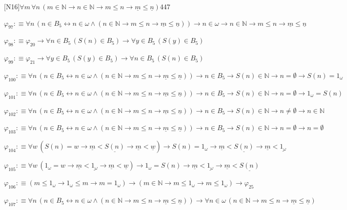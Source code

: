 \begin{fullproof}{[N16]}{$\forall m\,\forall n\,(m \in \mathbb{N} \to n \in \mathbb{N} \to m \leq n \to \underline{m} \leq \underline{n})$}{447}
\begin{abbrevlist}
\item $\varphi_{97} :\equiv \forall n\,(n \in B_{5} \leftrightarrow n \in \omega \land (n \in \mathbb{N} \to m \leq n \to \underline{m} \leq \underline{n})) \to n \in \omega \to n \in \mathbb{N} \to m \leq n \to \underline{m} \leq \underline{n}$
\item $\varphi_{98} :\equiv \varphi_{20} \to \forall n \in B_{5}\,(S(n) \in B_{5}) \to \forall y \in B_{5}\,(S(y) \in B_{5})$
\item $\varphi_{99} :\equiv \varphi_{21} \to \forall y \in B_{5}\,(S(y) \in B_{5}) \to \forall n \in B_{5}\,(S(n) \in B_{5})$
\item $\varphi_{100} :\equiv \forall n\,(n \in B_{5} \leftrightarrow n \in \omega \land (n \in \mathbb{N} \to m \leq n \to \underline{m} \leq \underline{n})) \to n \in B_{5} \to S(n) \in \mathbb{N} \to n = \emptyset \to S(n) = 1_{\omega}$
\item $\varphi_{101} :\equiv \forall n\,(n \in B_{5} \leftrightarrow n \in \omega \land (n \in \mathbb{N} \to m \leq n \to \underline{m} \leq \underline{n})) \to n \in B_{5} \to S(n) \in \mathbb{N} \to n = \emptyset \to 1_{\omega} = S(n)$
\item $\varphi_{102} :\equiv \forall n\,(n \in B_{5} \leftrightarrow n \in \omega \land (n \in \mathbb{N} \to m \leq n \to \underline{m} \leq \underline{n})) \to n \in B_{5} \to S(n) \in \mathbb{N} \to n \neq \emptyset \to n \in \mathbb{N}$
\item $\varphi_{103} :\equiv \forall n\,(n \in B_{5} \leftrightarrow n \in \omega \land (n \in \mathbb{N} \to m \leq n \to \underline{m} \leq \underline{n})) \to n \in B_{5} \to S(n) \in \mathbb{N} \to n = \emptyset \to n = \emptyset$
\item $\varphi_{104} :\equiv \forall w\,(S(n) = w \to \underline{m} < \underline{S(n)} \to \underline{m} < \underline{w}) \to S(n) = 1_{\omega} \to \underline{m} < \underline{S(n)} \to \underline{m} < \underline{1_{\omega}}$
\item $\varphi_{105} :\equiv \forall w\,(1_{\omega} = w \to \underline{m} < \underline{1_{\omega}} \to \underline{m} < \underline{w}) \to 1_{\omega} = S(n) \to \underline{m} < \underline{1_{\omega}} \to \underline{m} < \underline{S(n)}$
\item $\varphi_{106} :\equiv (m \leq 1_{\omega} \to 1_{\omega} \leq m \to m = 1_{\omega}) \to (m \in \mathbb{N} \to m \leq 1_{\omega} \to m \leq 1_{\omega}) \to \varphi_{25}$
\item $\varphi_{107} :\equiv \forall n\,(n \in B_{5} \leftrightarrow n \in \omega \land (n \in \mathbb{N} \to m \leq n \to \underline{m} \leq \underline{n})) \to \forall n \in \omega\,(n \in \mathbb{N} \to m \leq n \to \underline{m} \leq \underline{n})$

\end{abbrevlist}
\end{fullproof}
